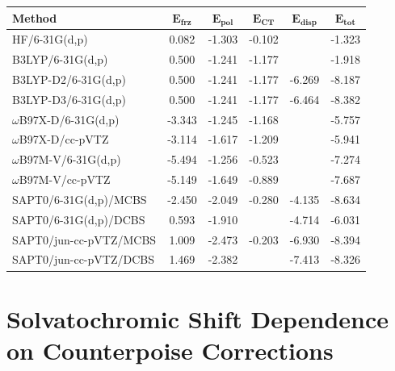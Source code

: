 \begin{table}[h]
  \centering
  \caption[Effect of empirical and self-consistent dispersion corrections in ALMO-EDA]{Effect of empirical and self-consistent dispersion corrections on ALMO-decomposed interaction energies with comparison to SAPT0. Values are weighted averages over the same \num{15} snapshots as in Table~\ref{paper_02:tab:6}. Energies are reported in \si{\kcal\per\mole}.}
  \label{paper_02:tab:S3}
  \begin{longtable}[]{@{}lccccc@{}}
    \toprule
    \textbf{Method} & \(\mathbf{E_{frz}}\) & \(\mathbf{E_{pol}}\) & \(\mathbf{E_{CT}}\) & \(\mathbf{E_{disp}}\) & \(\mathbf{E_{tot}}\)\tabularnewline
    \midrule
    \endhead
    HF/6-31G(d,p) & 0.082 & -1.303 & -0.102 & \textemdash{} & -1.323\tabularnewline
    B3LYP/6-31G(d,p) & 0.500 & -1.241 & -1.177 & \textemdash{} & -1.918\tabularnewline
    B3LYP-D2/6-31G(d,p) & 0.500 & -1.241 & -1.177 & -6.269 & -8.187\tabularnewline
    B3LYP-D3/6-31G(d,p) & 0.500 & -1.241 & -1.177 & -6.464 & -8.382\tabularnewline
    \(\omega\)B97X-D/6-31G(d,p) & -3.343 & -1.245 & -1.168 & \textemdash{} & -5.757\tabularnewline
    \(\omega\)B97X-D/cc-pVTZ & -3.114 & -1.617 & -1.209 & \textemdash{} & -5.941\tabularnewline
    \(\omega\)B97M-V/6-31G(d,p) & -5.494 & -1.256 & -0.523 & \textemdash{} & -7.274\tabularnewline
    \(\omega\)B97M-V/cc-pVTZ & -5.149 & -1.649 & -0.889 & \textemdash{} & -7.687\tabularnewline
    SAPT0/6-31G(d,p)/MCBS & -2.450 & -2.049 & -0.280 & -4.135 & -8.634\tabularnewline
    SAPT0/6-31G(d,p)/DCBS & 0.593 & -1.910 & & -4.714 & -6.031\tabularnewline
    SAPT0/jun-cc-pVTZ/MCBS & 1.009 & -2.473 & -0.203 & -6.930 & -8.394\tabularnewline
    SAPT0/jun-cc-pVTZ/DCBS & 1.469 & -2.382 & & -7.413 & -8.326\tabularnewline
    \bottomrule
  \end{longtable}
\end{table}

\section{Solvatochromic Shift Dependence on Counterpoise Corrections}
\label{paper_02:sec:SIV}

